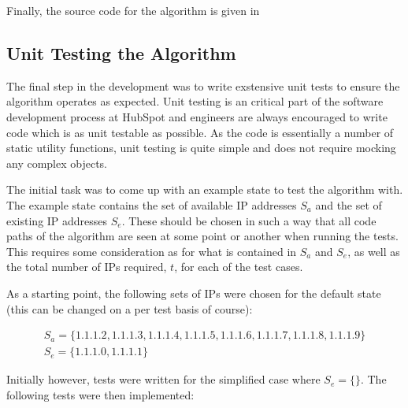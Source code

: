 Finally, the source code for the algorithm is given in 

\subsection{Unit Testing the Algorithm}
The final step in the development was to write exstensive unit tests to ensure the algorithm operates as expected. Unit testing is an critical part of the software development process at HubSpot and engineers are always encouraged to write code which is as unit testable as possible. As the code is essentially a number of static utility functions, unit testing is quite simple and does not require mocking any complex objects.  

The initial task was to come up with an example state to test the algorithm with. The example state contains the set of available IP addresses $S_a$ and the set of existing IP addresses $S_e$. These should be chosen in such a way that all code paths of the algorithm are seen at some point or another when running the tests. This requires some consideration as for what is contained in $S_a$ and $S_e$, as well as the total number of IPs required, $t$, for each of the test cases.

As a starting point, the following sets of IPs were chosen for the default state (this can be changed on a per test basis of course):

\begin{equation}\label{eq:initialState}
\begin{gathered}
S_a = \{1.1.1.2, 1.1.1.3, 1.1.1.4, 1.1.1.5, 1.1.1.6, 1.1.1.7, 1.1.1.8, 1.1.1.9\} \\
S_e = \{1.1.1.0, 1.1.1.1\}
\end{gathered}
\end{equation}

Initially however, tests were written for the simplified case where $S_e = \{\}$. The following tests were then implemented:

